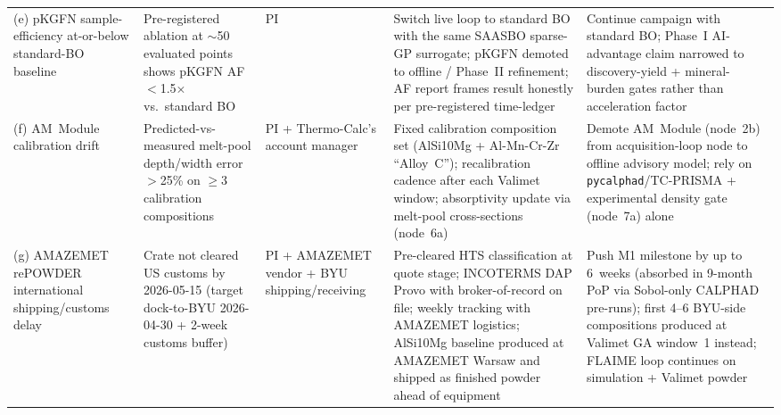 \documentclass[11pt,letterpaper]{article}
\begin{document}
\begin{table}[H]
\begin{tabularx}{\textwidth}{@{}p{}p{}p{}XX@{}}
\addlinespace[2pt]
(e) pKGFN sample-efficiency at-or-below standard-BO baseline & Pre-registered ablation at $\sim$50 evaluated points shows pKGFN AF $<$1.5$\times$ vs.\ standard BO & PI & Switch live loop to standard BO with the same SAASBO sparse-GP surrogate; pKGFN demoted to offline / Phase~II refinement; AF report frames result honestly per pre-registered time-ledger & Continue campaign with standard BO; Phase~I AI-advantage claim narrowed to discovery-yield + mineral-burden gates rather than acceleration factor \\
\addlinespace[2pt]
(f) AM~Module calibration drift & Predicted-vs-measured melt-pool depth/width error $>$25\% on $\geq$3 calibration compositions & PI + Thermo-Calc's account manager & Fixed calibration composition set (AlSi10Mg + Al-Mn-Cr-Zr ``Alloy~C''); recalibration cadence after each Valimet window; absorptivity update via melt-pool cross-sections (node~6a) & Demote AM~Module (node~2b) from acquisition-loop node to offline advisory model; rely on \texttt{pycalphad}/TC-PRISMA + experimental density gate (node~7a) alone \\
\addlinespace[2pt]
(g) AMAZEMET rePOWDER international shipping/customs delay & Crate not cleared US customs by 2026-05-15 (target dock-to-BYU 2026-04-30 + 2-week customs buffer) & PI + AMAZEMET vendor + BYU shipping/receiving & Pre-cleared HTS classification at quote stage; INCOTERMS DAP Provo with broker-of-record on file; weekly tracking with AMAZEMET logistics; AlSi10Mg baseline produced at AMAZEMET Warsaw and shipped as finished powder ahead of equipment & Push M1 milestone by up to 6~weeks (absorbed in 9-month PoP via Sobol-only CALPHAD pre-runs); first 4--6 BYU-side compositions produced at Valimet GA window~1 instead; FLAIME loop continues on simulation + Valimet powder \\
\bottomrule
\end{tabularx}
\end{table}
\end{document}
